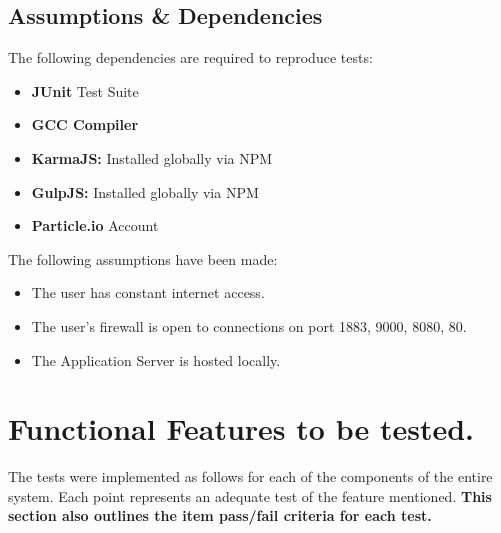 \documentclass[a4paper,10pt]{article}
\begin{document}
		\subsection{Assumptions \& Dependencies}
		The following dependencies are required to reproduce tests:
		\begin{itemize}
			\item \textbf{JUnit} Test Suite
			\item \textbf{GCC Compiler}
			\item \textbf{KarmaJS:} Installed globally via NPM
			\item \textbf{GulpJS:} Installed globally via NPM
			\item \textbf{Particle.io} Account
		\end{itemize}
		The following assumptions have been made:
		\begin{itemize}
			\item The user has constant internet access.
			\item The user's firewall is open to connections on port 1883, 9000, 8080, 80.
			\item The Application Server is hosted locally.	
		\end{itemize}
		
	\section{Functional Features to be tested.}
	The tests were implemented as follows for each of the components of the entire system. Each point represents an adequate test of the feature mentioned. \textbf{This section also outlines the item pass/fail criteria for each test.}
\end{document}
